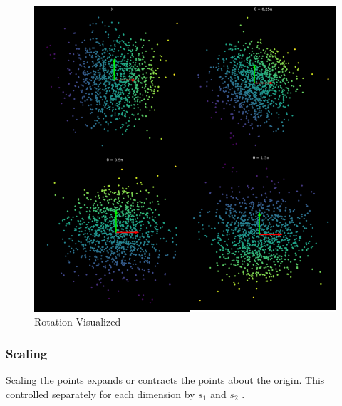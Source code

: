\begin{figure}[h!]
\begin{center}
\includegraphics{students/SP19_DL_Lab_1_Notes/images/Rotation.png}
\end{center} 
\caption{Rotation Visualized}
\label{fig:mon}
\end{figure}
\FloatBarrier


\subsubsection{Scaling}
Scaling the points expands or contracts the points about the origin. 
This controlled separately for each dimension by \(s_1\) and \(s_2\) .

